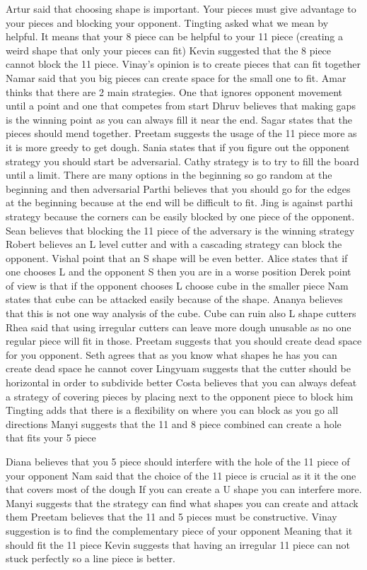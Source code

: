 Artur said that choosing shape is important. Your pieces must give advantage to your pieces and blocking your opponent.
Tingting asked what we mean by helpful. It means that your 8 piece can be helpful to your 11 piece (creating a weird shape that only your pieces can fit)
Kevin suggested that the 8 piece cannot block the 11 piece.
Vinay’s opinion is to create pieces that can fit together
Namar said that you big pieces can create space for the small one to fit.
Amar thinks that there are 2 main strategies. One that ignores opponent movement until a point and one that competes from start
Dhruv believes that making gaps is the winning point as you can always fill it near the end.
Sagar states that the pieces should mend together.
Preetam suggests the usage of the 11 piece more as it is more greedy to get dough.
Sania states that if you figure out the opponent strategy you should start be adversarial.
Cathy strategy is to try to fill the board until a limit. There are many options in the beginning so go random at the beginning and then adversarial
Parthi believes that you should go for the edges at the beginning because at the end will be difficult to fit.
Jing is against parthi strategy because the corners can be easily blocked by one piece of the opponent.
Sean believes that blocking the 11 piece of the adversary is the winning strategy
Robert believes an L level cutter and with a cascading strategy can block the opponent.
Vishal point that an S shape will be even better.
Alice states that if one chooses L and the opponent S then you are in a worse position
Derek point of view is that if the opponent chooses L choose cube in the smaller piece
Nam states that cube can be attacked easily because of the shape.
Ananya believes that this is not one way analysis of the cube. Cube can ruin also L shape cutters
Rhea said that using irregular cutters can leave more dough unusable as no one regular piece will fit in those.
Preetam suggests that you should create dead space for you opponent.
Seth agrees that as you know what shapes he has you can create dead space he cannot cover
Lingyuam suggests that the cutter should be horizontal in order to subdivide better
Costa believes that you can always defeat a strategy of covering pieces by placing next to the opponent piece to block him
Tingting adds that there is a flexibility on where you can block as you go all directions
Manyi suggests that the 11 and 8 piece combined can create a hole that fits your 5 piece

Diana believes that you 5 piece should interfere with the hole of the 11 piece of your opponent
Nam said that the choice of the 11 piece is crucial as it it the one that covers most of the dough
If you can create a U shape you can interfere more.
Manyi suggests that the strategy can find what shapes you can create and attack them
Preetam believes that the 11 and 5 pieces must be constructive.
Vinay suggestion is to find the complementary piece of your opponent
Meaning that it should fit the 11 piece
Kevin suggests that having an irregular 11 piece can not stuck perfectly so a line piece is better.
